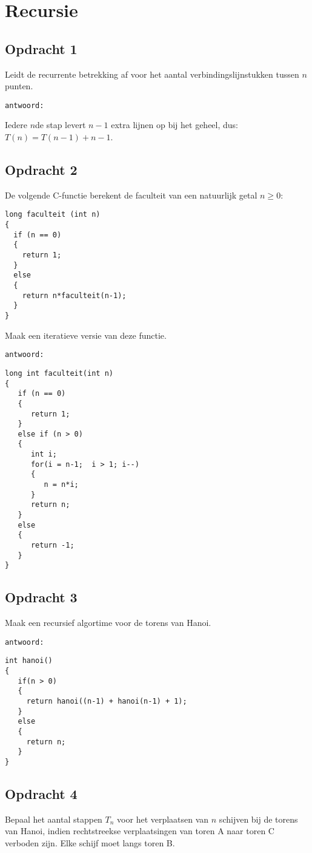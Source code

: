 \chapter{Recursie}
\section{Opdracht 1}
Leidt de recurrente betrekking af voor het aantal verbindingslijnstukken tussen $n$ punten.

\texttt{antwoord:}

Iedere $n$de stap levert $n-1$ extra lijnen op bij het geheel, dus: $T(n) = T(n-1) + n-1$.

\section{Opdracht 2}
De volgende C-functie berekent de faculteit van een natuurlijk getal $n\geq 0$:
\begin{lstlisting}
long faculteit (int n)
{
  if (n == 0)
  {
    return 1;
  }
  else
  {
    return n*faculteit(n-1);
  }
}
\end{lstlisting}
Maak een iteratieve versie van deze functie.

\texttt{antwoord:}

\begin{lstlisting}
long int faculteit(int n) 
{
   if (n == 0) 
   {
      return 1;
   }
   else if (n > 0) 
   {
      int i;
      for(i = n-1;  i > 1; i--) 
      {
         n = n*i;
      }
      return n;
   }
   else 
   {
      return -1;
   }
}
\end{lstlisting}

\section{Opdracht 3}
Maak een recursief algortime voor de torens van Hanoi.

\texttt{antwoord:}

\begin{lstlisting}
int hanoi() 
{
   if(n > 0) 
   {
     return hanoi((n-1) + hanoi(n-1) + 1);
   } 
   else 
   {
     return n;
   }
}
\end{lstlisting}

\section{Opdracht 4}
Bepaal het aantal stappen $T_n$ voor het verplaatsen van $n$ schijven bij de torens van Hanoi, indien rechtstreekse verplaatsingen van toren A naar toren C verboden zijn. Elke schijf moet langs toren B.

